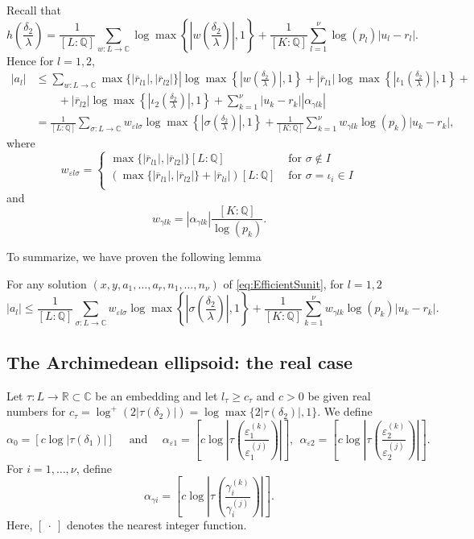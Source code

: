 Recall that
\[h\left(\frac{\delta_2}{\lambda}\right) = \frac{1}{[L:\mathbb{Q}]}\sum_{w :L \to \mathbb{C}} \log \max \left\{ \left|w\left(\frac{\delta_2}{\lambda}\right)\right|, 1\right\} + \frac{1}{[K:\mathbb{Q}]}\sum_{l = 1}^{\nu} \log(p_l)|u_l - r_l|.\]
Hence for $l = 1,2$, 
\begin{align*}
|a_l|	& \leq \sum_{w: L \to \mathbb{C}}\max\{|\overline{r}_{l1}|, |\overline{r}_{l2}|\}|\log\max\left\{\left|w\left(\frac{\delta_2}{\lambda}\right)\right|,1\right\} + |\overline{r}_{l1}|\log\max\left\{\left|\iota_1\left(\frac{\delta_2}{\lambda}\right)\right|,1\right\} + \\
	&\quad\quad + |\overline{r}_{l2}|\log\max\left\{\left|\iota_2\left(\frac{\delta_2}{\lambda}\right)\right|,1\right\}+ \sum_{k=1}^{\nu}|u_k-r_k||\alpha_{\gamma l k}|\\
	& = \frac{1}{[L:\mathbb{Q}]}\sum_{\sigma :L \to \mathbb{C}} w_{\varepsilon l \sigma}\log \max \left\{ \left|\sigma\left(\frac{\delta_2}{\lambda}\right)\right|, 1\right\} + \frac{1}{[K:\mathbb{Q}]}\sum_{k = 1}^{\nu} w_{\gamma l k}\log(p_k)|u_k - r_k|,
\end{align*}
where
\[w_{\varepsilon l \sigma} = 
\begin{cases}
\max\{|\overline{r}_{l1}|, |\overline{r}_{l2}|\}[L:\mathbb{Q}] & \text{ for } \sigma \notin I\\
\left(\max\{|\overline{r}_{l1}|, |\overline{r}_{l2}|\} + |\overline{r}_{li}|\right)[L:\mathbb{Q}] & \text{ for } \sigma = \iota_i \in I\\
\end{cases}\]
and 
\[w_{\gamma l k} = |\alpha_{\gamma l k}|\frac{[K:\mathbb{Q}]}{\log(p_k)}.\]

To summarize, we have proven the following lemma
\begin{lemma}\label{lem:mepsbound}
For any solution $(x,y,a_1, \dots, a_r, n_1, \dots, n_{\nu})$ of \eqref{eq:EfficientSunit}, for $l =1,2$
\[|a_l| \leq \frac{1}{[L:\mathbb{Q}]}\sum_{\sigma :L \to \mathbb{C}} w_{\varepsilon l \sigma}\log \max \left\{ \left|\sigma\left(\frac{\delta_2}{\lambda}\right)\right|, 1\right\} + \frac{1}{[K:\mathbb{Q}]}\sum_{k = 1}^{\nu} w_{\gamma l k}\log(p_k)|u_k - r_k|.\]
\end{lemma}

\subsection{The Archimedean ellipsoid: the real case}
Let $\tau:L\to\mathbb{R} \subset \mathbb{C}$ be an embedding and let $l_\tau\geq c_\tau$ and $c>0$ be given real numbers for $c_\tau=\log^+(2|\tau(\delta_2)|)= \log \max\{2|\tau(\delta_2)|,1\}$. We define 
\[\alpha_0 = [c\log|\tau(\delta_1)|] \quad \text{ and } \quad \alpha_{\varepsilon 1} =  \left[c\log\left|\tau\left(\frac{\varepsilon_1^{(k)}}{\varepsilon_1^{(j)}}\right)\right|\right],\ \  \alpha_{\varepsilon 2} =  \left[c\log\left|\tau\left(\frac{\varepsilon_2^{(k)}}{\varepsilon_2^{(j)}}\right)\right|\right].\]
For $i = 1, \dots, \nu$, define
\[\alpha_{\gamma i} = \left[c\log\left|\tau\left(\frac{\gamma_i^{(k)}}{\gamma_i^{(j)}}\right)\right|\right].\]
Here, $[ \ \cdot\  ]$ denotes the nearest integer function. 

